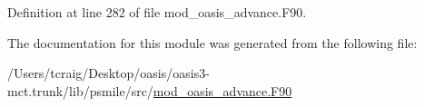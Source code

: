 Definition at line 282 of file mod\+\_\+oasis\+\_\+advance.\+F90.



The documentation for this module was generated from the following file\+:\begin{DoxyCompactItemize}
\item 
/\+Users/tcraig/\+Desktop/oasis/oasis3-\/mct.\+trunk/lib/psmile/src/\hyperlink{mod__oasis__advance_8_f90}{mod\+\_\+oasis\+\_\+advance.\+F90}\end{DoxyCompactItemize}
